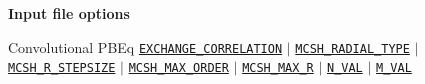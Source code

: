 \begin{frame}[allowframebreaks]{\textbf{Input file options}} \label{Index}
\vspace{-2mm}
 \begin{block}{Convolutional PBEq}
\hyperlink{EXCHANGE_CORRELATION}{\texttt{EXCHANGE\_CORRELATION}} $\vert$ 
\hyperlink{MCSH_RADIAL_TYPE}{\texttt{MCSH\_RADIAL\_TYPE}} $\vert$ 
\hyperlink{MCSH_R_STEPSIZE}{\texttt{MCSH\_R\_STEPSIZE}}  $\vert$ 
\hyperlink{MCSH_MAX_ORDER}{\texttt{MCSH\_MAX\_ORDER}} $\vert$ 
\hyperlink{MCSH_MAX_R}{\texttt{MCSH\_MAX\_R}} $\vert$ 
\hyperlink{N_VAL}{\texttt{N\_VAL}}  $\vert$
\hyperlink{M_VAL}{\texttt{M\_VAL}}
\end{block}

\end{frame}
